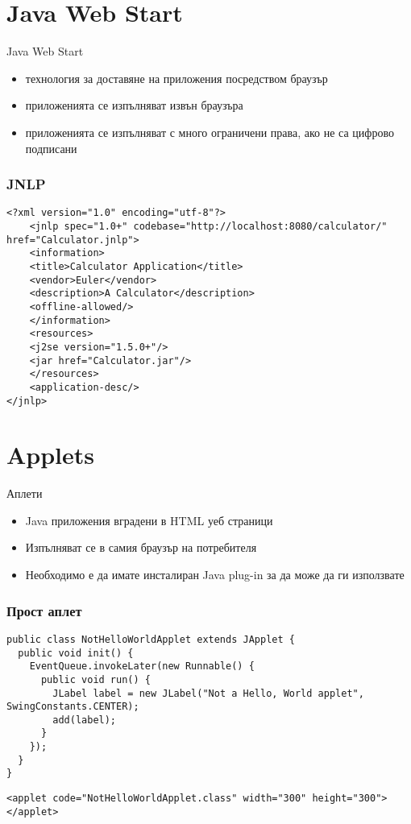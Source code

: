 \documentclass{beamer}
\begin{document}
\section{Java Web Start}

\begin{frame}{Java Web Start}
  \transdissolve
  \begin{itemize}
  \item технология за доставяне на приложения посредством браузър
  \item приложенията се изпълняват извън браузъра
  \item приложенията се изпълняват с много ограничени права, ако не са
    цифрово подписани
  \end{itemize}
\end{frame}

\begin{frame}[fragile]
  \frametitle{JNLP}
  \transdissolve
\begin{lstlisting}[basicstyle=\tiny]
<?xml version="1.0" encoding="utf-8"?>
    <jnlp spec="1.0+" codebase="http://localhost:8080/calculator/" href="Calculator.jnlp">
    <information>
    <title>Calculator Application</title>
    <vendor>Euler</vendor>
    <description>A Calculator</description>
    <offline-allowed/>
    </information>
    <resources>
    <j2se version="1.5.0+"/>
    <jar href="Calculator.jar"/>
    </resources>
    <application-desc/>
</jnlp>
\end{lstlisting}
\end{frame}

\section{Applets}

\begin{frame}{Аплети}
  \transdissolve
  \begin{itemize}
  \item Java приложения вградени в HTML уеб страници
  \item Изпълняват се в самия браузър на потребителя
  \item Необходимо е да имате инсталиран Java plug-in за да може да ги използвате
  \end{itemize}
\end{frame}

\begin{frame}[fragile]
  \frametitle{Прост аплет}
  \transdissolve
\begin{lstlisting}[basicstyle=\tiny]
public class NotHelloWorldApplet extends JApplet {
  public void init() {
    EventQueue.invokeLater(new Runnable() {
      public void run() {
        JLabel label = new JLabel("Not a Hello, World applet", SwingConstants.CENTER);
        add(label);
      }
    });
  }
}
\end{lstlisting}
\begin{lstlisting}[basicstyle=\tiny]
<applet code="NotHelloWorldApplet.class" width="300" height="300">
</applet>
\end{lstlisting}

\end{frame}
\end{document}
